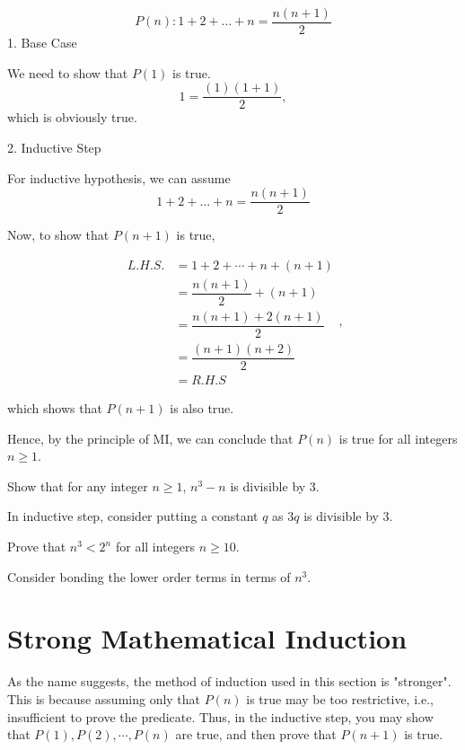 \begin{eg}
  \[
    P(n): 1 + 2 + \dots + n = \dfrac{n(n+1)}{2}
  \] 
  1. Base Case

  We need to show that \(P(1)\) is true. 
  \[
    1 = \dfrac{(1)(1+1)}{2}, 
  \] 
  which is obviously true.
  
  2. Inductive Step

  For inductive hypothesis, we can assume \[1 + 2 + \dots + n = \dfrac{n(n+1)}{2}\]

  Now, to show that \(P(n+1)\) is true, 

  \[
  \begin{aligned}
    L.H.S. &= 1 + 2 + \cdots + n + (n+1)\\
    &= \dfrac{n(n+1)}{2} + (n+1) \\
    &= \dfrac{n(n+1) + 2(n+1)}{2} \\
    &= \dfrac{(n+1)(n+2)}{2} \\
    &= R.H.S
  \end{aligned},
  \]

  which shows that \(P(n+1)\) is also true.

  Hence, by the principle of MI, we can conclude that \(P(n)\) is true for all integers \(n \geq 1\).
\end{eg}

\begin{exercise}
  Show that for any integer \(n \geq 1\), \(n^3 - n\) is divisible by 3.
  \begin{note}
    In inductive step, consider putting a constant \(q\) as \(3q\) is divisible by 3.
  \end{note}
\end{exercise}

\begin{exercise}
  Prove that \(n^3 < 2^n\) for all integers \(n \geq 10\).  
  \begin{note}
    Consider bonding the lower order terms in terms of \(n^3\).
  \end{note}
\end{exercise}

\section{Strong Mathematical Induction}
As the name suggests, the method of induction used in this section is "stronger". This is because assuming only that \(P(n)\) is true may be too restrictive, i.e., insufficient to prove the predicate. Thus, in the inductive step, you may show that \(P(1), P(2), \cdots, P(n)\) are true, and then prove that \(P(n+1)\) is true.

